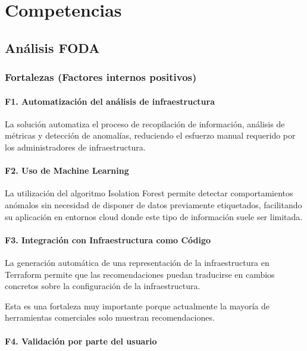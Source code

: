 \chapter{Competencias}

\section{Análisis FODA}

\subsection{Fortalezas (Factores internos positivos)}

\subsubsection*{F1. Automatización del análisis de infraestructura}

La solución automatiza el proceso de recopilación de información, análisis de métricas y detección de anomalías, reduciendo el esfuerzo manual requerido por los administradores de infraestructura.

\subsubsection*{F2. Uso de Machine Learning}

La utilización del algoritmo Isolation Forest permite detectar comportamientos anómalos sin necesidad de disponer de datos previamente etiquetados, facilitando su aplicación en entornos cloud donde este tipo de información suele ser limitada.

\subsubsection*{F3. Integración con Infraestructura como Código}

La generación automática de una representación de la infraestructura en Terraform permite que las recomendaciones puedan traducirse en cambios concretos sobre la configuración de la infraestructura.

Esta es una fortaleza muy importante porque actualmente la mayoría de herramientas comerciales solo muestran recomendaciones.

\subsubsection*{F4. Validación por parte del usuario}

